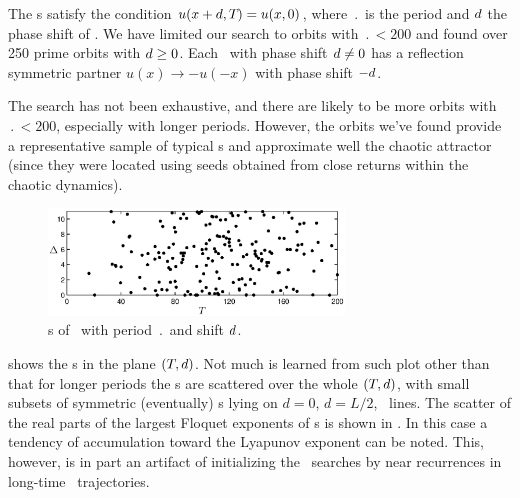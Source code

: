 

The \rpo s satisfy the condition $u(x+d,{T_{}}) = u(x,0)$, where $\period{}$
is the period and $d$ the phase shift of \rpo .  We have
limited our search to orbits with $\period{} < 200$ and found over 250 prime
orbits with $d \ge 0$.  Each \rpo\ with phase shift $d \neq 0$
has a reflection symmetric partner $u(x) \to -u(-x)$ with phase shift $-d$.

The search has not been exhaustive, and there are likely to be more
orbits with $\period{} < 200$, especially with longer periods.  However, the
orbits we've found provide a representative sample of typical \rpo s
and approximate well the chaotic attractor (since they were located
using seeds obtained from close returns within the chaotic
dynamics).


\begin{figure}[t]
\begin{center}
\includegraphics[width=0.7\textwidth]{figs/ks22_rpos_Tdelta.eps}
\end{center}
\caption{\Rpo s of \KSe\ with period $\period{}$ and shift $d$.
        } \label{f:ks22rposT}
\end{figure}

 shows the \rpo s in the plane $({T_{}},d)$. Not much
is learned from such plot other than that for longer periods 
the \rpo s are scattered over the whole $({T_{}},d)$, with small
subsets of symmetric (eventually) 
\po s lying on $d=0$, $d=L/2$, \etc\ lines.
%
The scatter of the real parts of the
largest Floquet exponents of \rpo s is shown in
. In this case a tendency of accumulation toward the
Lyapunov exponent
can be noted. This, however, is in part an artifact of initializing
the \rpo\ searches by near recurrences in long-time \statesp\ trajectories.

